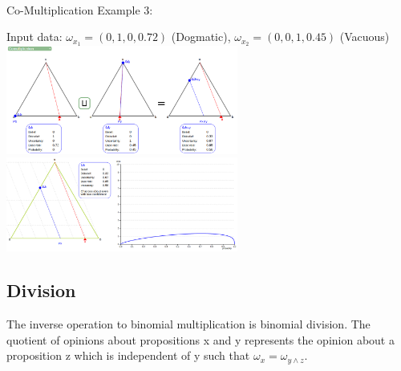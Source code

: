 \documentclass[UTF8]{article}
\newcommand{\opinion}[5]{$\omega_{#1} = (#2, #3, #4, #5)$}
\begin{document}
    \hrulefill\\
Co-Multiplication Example 3:
    \begin{center}
        Input data: 
        \opinion{x_1}{0}{1}{0}{0.72} (Dogmatic), 
        \opinion{x_2}{0}{0}{1}{0.45} (Vacuous)\\
        \includegraphics[width=3in]{images/comul3.png}
        \includegraphics[width=3in]{images/comul3viz.png}
\end{center}
\subsection{Division}
The inverse operation to binomial multiplication is binomial division. The quotient
of opinions about propositions x and y represents the opinion about a proposition z
which is independent of y such that $\omega_x = \omega_{y \land z}$.
\end{document}
